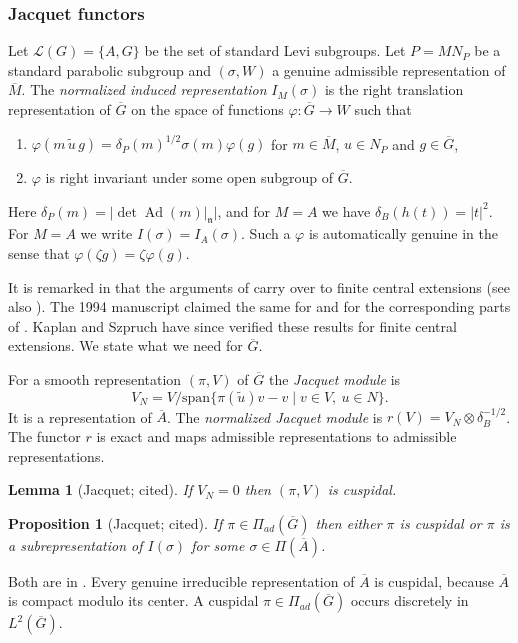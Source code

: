 \documentclass[12pt,letterpaper]{article}
\numberwithin{equation}{section}
\newtheorem{proposition}[theorem]{Proposition}
\newtheorem{lemma}[theorem]{Lemma}
\theoremstyle{definition}
\newcommand{\cited}{cited}
\newcommand{\bG}{\overline{G}}
\newcommand{\bA}{\overline{A}}
\DeclareMathOperator{\Ad}{Ad}
\newcommand{\Pia}{\Pi_{ad}(\bG)}
\begin{document}
\subsubsection{Jacquet functors}

Let $\mathcal L(G)=\{A,G\}$ be the set of standard Levi subgroups.  Let $P=MN_P$ be a
standard parabolic subgroup and $(\sigma,W)$ a genuine admissible representation of
$\overline M$.  The \emph{normalized induced representation} $I_M(\sigma)$ is the right
translation representation of $\bG$ on the space of functions $\varphi:\bG\to W$ such that
\begin{enumerate}[label=(\arabic*),leftmargin=*,itemsep=1pt]
\item $\varphi(m\,\tilde u\,g)=\delta_P(m)^{1/2}\sigma(m)\varphi(g)$ for $m\in\overline M$,
$u\in N_P$ and $g\in\bG$,
\item $\varphi$ is right invariant under some open subgroup of $\bG$.
\end{enumerate}
Here $\delta_P(m)=|\det\Ad(m)|_{\mathfrak n}|$, and for $M=A$ we have
$\delta_B(h(t))=|t|^2$.  For $M=A$ we write $I(\sigma)=I_A(\sigma)$.  Such a $\varphi$ is
automatically genuine in the sense that $\varphi(\zeta g)=\zeta\varphi(g)$.

It is remarked in \cite[\S2.2]{BD84} that the arguments of \cite[Ch.~2]{BZ76} carry over
to finite central extensions (see also \cite[\S1.2]{KP84}).  The 1994 manuscript claimed
the same for \cite[\S2]{BZ77} and for the corresponding parts of \cite{Ca95}.  Kaplan and
Szpruch \cite{KS23} have since verified these results for finite central extensions.  We state what we need for $\bG$.

For a smooth representation $(\pi,V)$ of $\bG$ the \emph{Jacquet module} is
\[
V_N=V/\mathrm{span}\{\pi(\tilde u)v-v\mid v\in V,\ u\in N\}.
\]
It is a representation of $\bA$.  The \emph{normalized Jacquet module} is
$r(V)=V_N\otimes\delta_B^{-1/2}$.  The functor $r$ is exact and maps admissible
representations to admissible representations.

\begin{lemma}[Jacquet; \cited]\label{lem:jacquet1}
If $V_N=0$ then $(\pi,V)$ is cuspidal.
\end{lemma}

\begin{proposition}[Jacquet; \cited]\label{prop:jacquet2}
If $\pi\in\Pia$ then either $\pi$ is cuspidal or $\pi$ is a subrepresentation of $I(\sigma)$
for some $\sigma\in\Pi(\bA)$.
\end{proposition}
Both are in \cite[\S3]{KS23}.  Every genuine irreducible representation of $\bA$ is cuspidal,
because $\bA$ is compact modulo its center.  A cuspidal $\pi\in\Pia$ occurs discretely in
$L^2(\bG)$.
\end{document}
